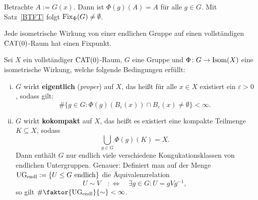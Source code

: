 \begin{beweis}
	Betrachte $A := G(x)$.
	Dann ist $\Phi(g)(A) = A$ für alle $g \in G$. Mit Satz~\ref{BTFT} folgt $\operatorname{Fix}_\Phi(G) \neq \emptyset$.
\end{beweis}

\begin{bemerkung}
\label{bem:1.29}
	Jede isometrische Wirkung von einer endlichen Gruppe auf einen vollständigen $\operatorname{CAT(0)}$-Raum hat einen Fixpunkt.
\end{bemerkung}

\begin{korollar}
\label{kor:1.30}
	Sei $X$ ein vollständiger $\operatorname{CAT(0)}$-Raum, $G$ eine Gruppe und $\Phi \colon G \rightarrow \operatorname{Isom}(X)$ eine isometrische Wirkung, welche folgende Bedingungen erfüllt:
	\begin{enumerate}[(i)]
		\item $G$ wirkt \textbf{eigentlich} (\textit{proper}) auf $X$, das heißt für alle $x \in X$ existiert ein $\varepsilon > 0$, sodass gilt:	
		\[
			\#\{g \in G : \Phi(g)(B_\varepsilon(x)) \cap B_\varepsilon(x) \neq \emptyset\} < \infty.
		\]
		\item $G$ wirkt \textbf{kokompakt} auf $X$, das heißt es existiert eine kompakte Teilmenge $K \subseteq X$, sodass 
		\[
			\bigcup\limits_{g \in G} \Phi(g)(K) = X.
		\]
		Dann enthält $G$ nur endlich viele verschiedene Kongukationsklassen von endlichen Untergruppen.
		Genauer: Definiert man auf der Menge $\operatorname{UG_{endl}} := \{U \leq G \text{ endlich}\}$ die Äquivalenzrelation 
		\[
			U \sim V \quad :\Leftrightarrow \quad \exists g \in G : U = gVg^{-1},
		\]
		so gilt $\# \faktor{\UGend}{\sim} < \infty$.
	\end{enumerate}
\end{korollar}

